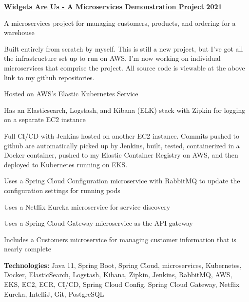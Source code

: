 %
    \headerrow
        {\textbf{\href{https://github.com/johatfie/widgets-are-us}{Widgets Are Us - A Microservices Demonstration Project}}}
        {\textbf{2021}}
    \begin{itemize*}
        \item A microservices project for managing customers, products, and ordering for a warehouse
        \item Built entirely from scratch by myself.  This is still a new project, but I've got all the infrastructure set up to run
            on AWS.  I'm now working on individual microservices that comprise the project.  All source code is viewable
            at the above link to my github repositories.
        \item Hosted on AWS's Elastic Kubernetes Service
        \item Has an Elasticsearch, Logstash, and Kibana (ELK) stack with Zipkin for logging on a separate EC2 instance
        \item Full CI/CD with Jenkins hosted on another EC2 instance.  Commits pushed to github are automatically picked up by
            Jenkins, built, tested, containerized in a Docker container, pushed to my Elastic Container Registry on AWS, and then
            deployed to Kubernetes running on EKS.
        \item Uses a Spring Cloud Configuration microservice with RabbitMQ to update the configuration settings for running pods
        \item Uses a Netflix Eureka microservice for service discovery
        \item Uses a Spring Cloud Gateway microservice as the API gateway
        \item Includes a Customers microservice for managing customer information that is nearly complete
    \end{itemize*}

    \hspace{1.0em}
        {\textbf{Technologies:} Java 11, Spring Boot, Spring Cloud, microservices, Kubernetes, Docker, ElasticSearch,
        Logstash, Kibana, Zipkin, Jenkins, RabbitMQ, AWS, EKS, EC2, ECR, CI/CD, Spring Cloud Config, Spring Cloud Gateway,
        Netflix Eureka, IntelliJ, Git, PostgreSQL}

